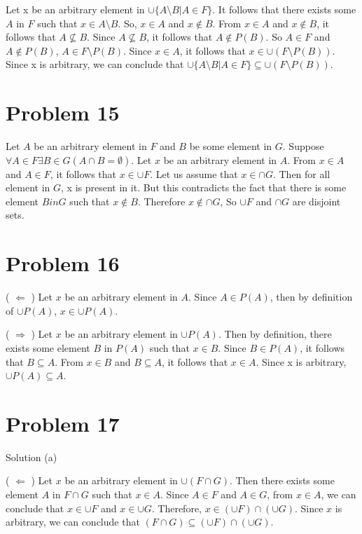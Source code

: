 \documentclass{article}
\begin{document}
Let x be an arbitrary element in $\cup \{ A \setminus B | A \in F \}$.
It follows that there exists some $A$ in $F$ such that $x \in A
\setminus B$. So, $x \in A$ and $x \notin B$. From $x \in A$ and $x
\notin B$, it follows that $A \nsubseteq B$. Since $A \nsubseteq B$,
it follows that $A \notin P(B)$. So $A \in F$ and $A \notin P(B)$, $A
\in F \setminus P(B)$. Since $x \in A$, it follows that $x \in \cup(F
\setminus P(B))$. Since x is arbitrary, we can conclude that $\cup \{
A \setminus B | A \in F \} \subseteq \cup (F \setminus P(B))$.

\section{Problem 15}

Let $A$ be an arbitrary element in $F$ and $B$ be some element in $G$.
Suppose $\forall A \in F \exists B \in G (A \cap B = \emptyset)$. Let
$x$ be an arbitrary element in $A$. From $x \in A$ and $A \in F$, it
follows that $x \in \cup F$. Let us assume that $x \in \cap G$. Then
for all element in $G$, x is present in it. But this contradicts the
fact that there is some element $B in G$ such that $x \notin B$.
Therefore $x \notin \cap G$, So $\cup F$ and $\cap G$ are disjoint
sets.

\section{Problem 16}

( $\Leftarrow$ ) Let $x$ be an arbitrary element in $A$. Since $A \in
P(A)$, then by definition of $\cup P(A)$, $x \in \cup P(A)$.

( $\Rightarrow$ ) Let $x$ be an arbitrary element in $\cup P(A)$. Then
by definition, there exists some element $B$ in $P(A)$ such that $x
\in B$. Since $B \in P(A)$, it follows that $B \subseteq A$. From $x
\in B$ and $B \subseteq A$, it follows that $x \in A$. Since x is
arbitrary, $\cup P(A) \subseteq A$.

\section{Problem 17}

Solution (a)

( $\Leftarrow$ ) Let $x$ be an arbitrary element in $\cup(F \cap G)$.
Then there exists some element $A$ in $F \cap G$ such that $x \in A$.
Since $A \in F$ and $A \in G$, from $x \in A$, we can conclude that $x
\in \cup F$ and $x \in \cup G$. Therefore, $x \in (\cup F) \cap (\cup
G)$. Since $x$ is arbitrary, we can conclude that $(F \cap G)
\subseteq (\cup F) \cap (\cup G)$.
\end{document}
